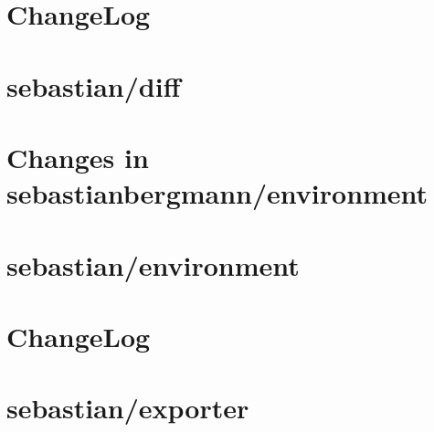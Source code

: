 \documentclass[twoside]{book}
\newcommand{\+}{\discretionary{\mbox{\scriptsize$\hookleftarrow$}}{}{}}
\begin{document}
\chapter{Change\+Log}
\label{md__c__workspace__proyecto__p_h_p_project_vendor_sebastian_diff__change_log}

\chapter{sebastian/diff}
\label{md__c__workspace__proyecto__p_h_p_project_vendor_sebastian_diff__r_e_a_d_m_e}

\chapter{Changes in sebastianbergmann/environment}
\label{md__c__workspace__proyecto__p_h_p_project_vendor_sebastian_environment__change_log}

\chapter{sebastian/environment}
\label{md__c__workspace__proyecto__p_h_p_project_vendor_sebastian_environment__r_e_a_d_m_e}

\chapter{Change\+Log}
\label{md__c__workspace__proyecto__p_h_p_project_vendor_sebastian_exporter__change_log}

\chapter{sebastian/exporter}
\label{md__c__workspace__proyecto__p_h_p_project_vendor_sebastian_exporter__r_e_a_d_m_e}

\end{document}
